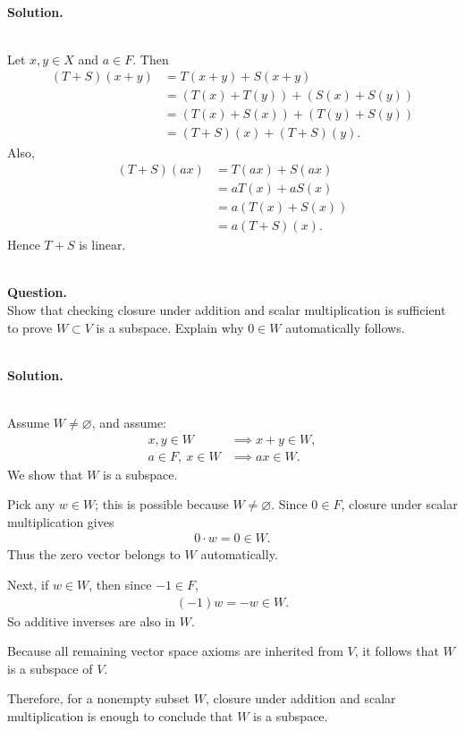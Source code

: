 \documentclass{article}
\begin{document}
\noindent\\
\textbf{Solution.}\\
\quad\\
\begin{mdframed}[linewidth=1pt]
Let $x,y\in X$ and $a\in F$. Then
\begin{align*}
(T+S)(x+y)
&=T(x+y)+S(x+y) \\
&=(T(x)+T(y))+(S(x)+S(y)) \\
&=(T(x)+S(x))+(T(y)+S(y)) \\
&=(T+S)(x)+(T+S)(y).
\end{align*}
Also,
\begin{align*}
(T+S)(ax)
&=T(ax)+S(ax) \\
&=aT(x)+aS(x) \\
&=a(T(x)+S(x)) \\
&=a(T+S)(x).
\end{align*}
Hence $T+S$ is linear.
\end{mdframed}

\bigskip

\hfill \break  $~\!\!$ \dotfill \medskip \\
\textbf{Question.}\\
Show that checking closure under addition and scalar multiplication is sufficient to prove $W \subset V$ is a subspace. Explain why $0 \in W$ automatically follows.

\quad\\
\noindent
\textbf{Solution.}\\
\quad\\
\begin{mdframed}[linewidth=1pt]
Assume $W\neq \varnothing$, and assume:
\begin{align*}
x,y\in W &\implies x+y\in W, \\
a\in F,\ x\in W &\implies ax\in W.
\end{align*}
We show that $W$ is a subspace.

Pick any $w\in W$; this is possible because $W\neq\varnothing$. Since $0\in F$, closure under scalar multiplication gives
\begin{align*}
0\cdot w=0\in W.
\end{align*}
Thus the zero vector belongs to $W$ automatically.

Next, if $w\in W$, then since $-1\in F$,
\begin{align*}
(-1)w=-w\in W.
\end{align*}
So additive inverses are also in $W$.

Because all remaining vector space axioms are inherited from $V$, it follows that $W$ is a subspace of $V$.

Therefore, for a nonempty subset $W$, closure under addition and scalar multiplication is enough to conclude that $W$ is a subspace.
\end{mdframed}
\end{document}
